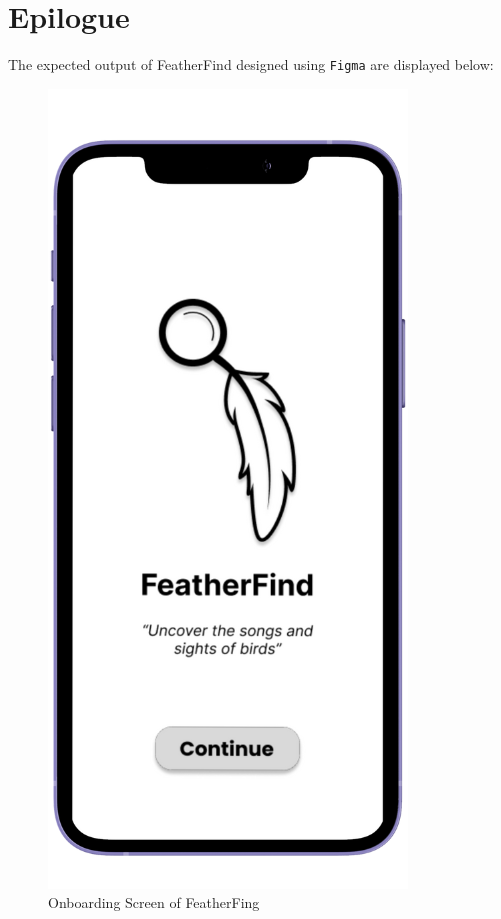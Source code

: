 \chapter{Epilogue}
The expected output of FeatherFind designed using \texttt{Figma} are displayed
below:
\begin{figure}[h!]
    \centering
    \includegraphics[scale=0.6]{images/onboarding_mockup.png}
    \caption{Onboarding Screen of
        FeatherFing}%
\end{figure}
